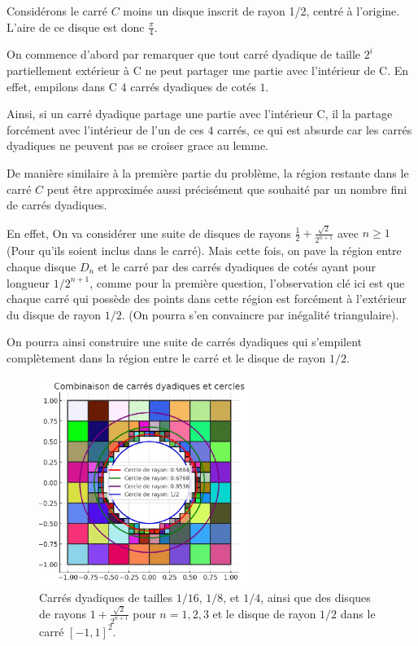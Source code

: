 Consid{\'e}rons le carr{\'e} $C$ moins un disque inscrit de rayon 1/2,
centr{\'e} {\`a} l'origine. L'aire de ce disque est donc $\frac{\pi}{4}$.

On commence d'abord par remarquer que tout carr{\'e} dyadique de taille $2^i$
partiellement ext{\'e}rieur {\`a} C ne peut partager une partie avec
l'int{\'e}rieur de C. En effet, empilons dans C $4$ carr{\'e}s dyadiques de
cot{\'e}s $1$.

Ainsi, si un carr{\'e} dyadique partage une partie avec l'int{\'e}rieur C, il
la partage forc{\'e}ment avec l'int{\'e}rieur de l'un de ces $4$ carr{\'e}s,
ce qui est absurde car les carr{\'e}s dyadiques ne peuvent pas se croiser
grace au lemme. \tmtextbf{}

De mani{\`e}re similaire {\`a} la premi{\`e}re partie du probl{\`e}me, la
r{\'e}gion restante dans le carr{\'e} $C$ peut {\^e}tre approxim{\'e}e aussi
pr{\'e}cis{\'e}ment que souhait{\'e} par un nombre fini de carr{\'e}s
dyadiques.

En effet, On va consid{\'e}rer une suite de disques de rayons $\frac{1}{2} +
\frac{\sqrt{2}}{2^{n + 1}}$ avec $n \geq 1$ (Pour qu'ils soient inclus dans le
carr{\'e}). Mais cette fois, on pave la r{\'e}gion entre chaque disque $D_n$
et le carr{\'e} par des carr{\'e}s dyadiques de cot{\'e}s ayant pour longueur
$1 / 2^{n + 1}$, comme pour la premi{\`e}re question, l'observation cl{\'e}
ici est que chaque carr{\'e} qui poss{\`e}de des points dans cette r{\'e}gion
est forc{\'e}ment {\`a} l'ext{\'e}rieur du disque de rayon $1 / 2$. (On pourra
s'en convaincre par in{\'e}galit{\'e} triangulaire).

On pourra ainsi construire une suite de carr{\'e}s dyadiques qui s'empilent
compl{\`e}tement dans la r{\'e}gion entre le carr{\'e} et le disque de rayon
$1 / 2$.

\begin{figure}[h]
  \centering
  \includegraphics[width=6.831cm,height=6.761cm]{figures/Math_oraux-4.pdf}
  \caption{Carr{\'e}s dyadiques de tailles $1 / 16$, $1 / 8$, et $1 / 4$,
  ainsi que des disques de rayons $1 + \frac{\sqrt{2}}{2^{n + 1}}$ pour $n =
  1, 2, 3$ et le disque de rayon $1 / 2$ dans le carr{\'e} $[-1, 1]^2$.}
\end{figure}


